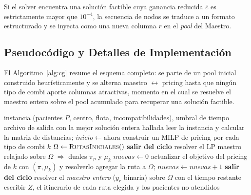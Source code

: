 \documentclass[12pt]{article}
\numberwithin{algorithm}{section}
\begin{document}
Si el solver encuentra una solución factible cuya ganancia reducida $\bar{c}$ es estrictamente mayor que $10^{-4}$, la secuencia de nodos se traduce a un formato estructurado y se inyecta como una nueva columna $r$ en el \textit{pool} del Maestro.

\subsection{Pseudocódigo y Detalles de Implementación}

El Algoritmo~\ref{alg:cg} resume el esquema completo: se parte de un pool inicial construido
heurísticamente y se alterna maestro $\leftrightarrow$ pricing hasta que ningún tipo de combi
aporte columnas atractivas, momento en el cual se resuelve el maestro entero sobre el pool
acumulado para recuperar una solución factible.

\begin{algorithm}[H]
\caption{\textsc{SaludCG} --- generación de columnas}
\label{alg:cg}
\begin{algorithmic}[1]
\Require instancia (pacientes $P$, centro, flota, incompatibilidades), umbral de tiempo
\Ensure archivo de salida con la mejor solución entera hallada
\State leer la instancia y calcular la matriz de distancias; $\mathit{inicio} \gets \text{ahora}$
\State construir un MILP de pricing por cada tipo de combi $k$ 
\State $\Omega \gets \Call{RutasIniciales}{ }$ 
\Loop
     \textbf{salir del ciclo}
    \EndIf
    \State resolver el LP maestro relajado sobre $\Omega$ $\Rightarrow$ duales $\pi_p$ y $\mu_k$
    \State $\mathit{nuevas} \gets 0$
        \State actualizar el objetivo del pricing de $k$ con $(\pi, \mu_k)$ y resolverlo
            \State agregar la ruta a $\Omega$; $\mathit{nuevas} \gets \mathit{nuevas} + 1$
        \EndIf
    \EndFor
     \textbf{salir del ciclo} 
    \EndIf
\EndLoop
\State resolver el \emph{maestro entero} ($y_r$ binaria) sobre $\Omega$ con el tiempo restante
\State escribir $Z$, el itinerario de cada ruta elegida y los pacientes no atendidos
\end{algorithmic}
\end{algorithm}
\end{document}
